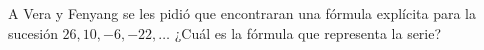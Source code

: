 \question[10] A Vera y Fenyang se les pidió que encontraran una fórmula explícita para la sucesión $26,10,-6,-22, \dots$ 
¿Cu\'al es la f\'ormula que representa la serie? \fillin[$26-16(n-1)$]
